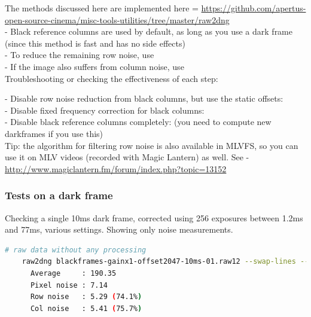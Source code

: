 {The methods discussed here are implemented here = \href{https://github.com/apertus-open-source-cinema/misc-tools-utilities/tree/master/raw2dng}{https://github.com/apertus-open-source-cinema/misc-tools-utilities/tree/master/raw2dng} \\

- Black reference columns are used by default, as long as you use a dark frame (since this method is fast and has no side effects)\\
- To reduce the remaining row noise, use \\
- If the image also suffers from column noise, use  \\

Troubleshooting or checking the effectiveness of each step:

- Disable row noise reduction from black columns, but use the static offsets: \\
- Disable fixed frequency correction for black columns: \\
- Disable black reference columns completely:  (you need to compute new darkframes if you use this)\\ 

Tip: the algorithm for filtering row noise is also available in MLVFS, so you can use it on MLV videos (recorded with Magic Lantern) as well. See - \href{http://www.magiclantern.fm/forum/index.php?topic=13152}{http://www.magiclantern.fm/forum/index.php?topic=13152}





\subsubsection{Tests on a dark frame}

Checking a single 10ms dark frame, corrected using 256 exposures between 1.2ms and 77ms, various settings. Showing only noise measurements.

\begin{lstlisting}[language=bash,morekeywords=$,keywordstyle=\bfseries,frame=none,xleftmargin=.25in,belowskip=2em, aboveskip=2em]
    # raw data without any processing
    raw2dng blackframes-gainx1-offset2047-10ms-01.raw12 --swap-lines --no-darkframe --check-darkframe
      Average     : 190.35
      Pixel noise : 7.14
      Row noise   : 5.29 (74.1%)
      Col noise   : 5.41 (75.7%)
\end{lstlisting}

}
